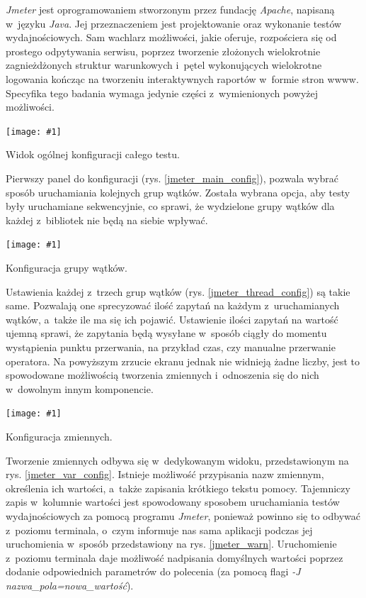\documentclass[12pt]{article}
\newcommand{\n}{\newline}
\newcommand{\putss}[3]{
\begin{captioned}[H]
	\centering
	\texttt{[image: \#1]}
	\caption{#2}
	\label{#3}
	\medskip
\end{captioned}
}
\newcommand{\nonpl}[1]{{\it #1}}
\newcommand{\code}[1]{{\it #1}}
\newcommand{\Jmeter}{\nonpl{Jmeter}\texttrademark}
\begin{document}
{{{				\Jmeter\cite{jmeter} jest oprogramowaniem stworzonym przez fundację \nonpl{Apache}, napisaną w~języku \nonpl{Java}. Jej przeznaczeniem
				jest projektowanie oraz wykonanie testów wydajnościowych. Sam wachlarz możliwości, jakie oferuje, rozpościera się od prostego odpytywania serwisu, poprzez
				tworzenie złożonych wielokrotnie zagnieżdżonych struktur warunkowych i~pętel wykonujących wielokrotne logowania kończąc na tworzeniu interaktywnych
				raportów w~formie stron wwww. Specyfika tego badania wymaga jedynie części z~wymienionych powyżej możliwości.

				\putss{./img/jmeter_ss/main_pane.png}{ Widok ogólnej konfiguracji całego testu.}{jmeter_main_config}

				Pierwszy panel do konfiguracji (rys. \ref{jmeter_main_config}), pozwala wybrać sposób uruchamiania kolejnych grup wątków. Została wybrana opcja,
				aby testy były uruchamiane sekwencyjnie, co sprawi, że wydzielone grupy wątków dla każdej z~bibliotek nie będą na siebie wpływać.\n

				\putss{./img/jmeter_ss/thread_group_config.png}{ Konfiguracja grupy wątków.}{jmeter_thread_config}

				Ustawienia każdej z~trzech grup wątków (rys. \ref{jmeter_thread_config}) są takie same. Pozwalają one sprecyzować ilość zapytań na każdym z~uruchamianych wątków,
				a~także ile ma się ich pojawić. Ustawienie ilości zapytań na wartość ujemną sprawi, że zapytania będą wysyłane w~sposób ciągły do momentu wystąpienia punktu przerwania,
				na przykład czas, czy manualne przerwanie operatora. Na powyższym zrzucie ekranu jednak nie widnieją żadne liczby, jest to spowodowane możliwością tworzenia zmiennych
				i~odnoszenia się do nich w~dowolnym innym komponencie.\n

				\putss{./img/jmeter_ss/variables.png}{ Konfiguracja zmiennych.}{jmeter_var_config}

				Tworzenie zmiennych odbywa się w~dedykowanym widoku, przedstawionym na rys. \ref{jmeter_var_config}. Istnieje możliwość przypisania nazw zmiennym, określenia ich wartości,
				a~także zapisania krótkiego tekstu pomocy. Tajemniczy zapis w~kolumnie wartości jest spowodowany sposobem uruchamiania testów wydajnościowych za pomocą programu \Jmeter,
				ponieważ powinno się to odbywać z~poziomu terminala, o~czym informuje nas sama aplikacji podczas jej uruchomienia w~sposób przedstawiony na rys. \ref{jmeter_warn}.
				Uruchomienie z~poziomu terminala daje możliwość nadpisania domyślnych wartości poprzez dodanie odpowiednich parametrów do polecenia (za pomocą flagi \code{-J nazwa\_pola=nowa\_wartość}).\n

}}}
\end{document}

